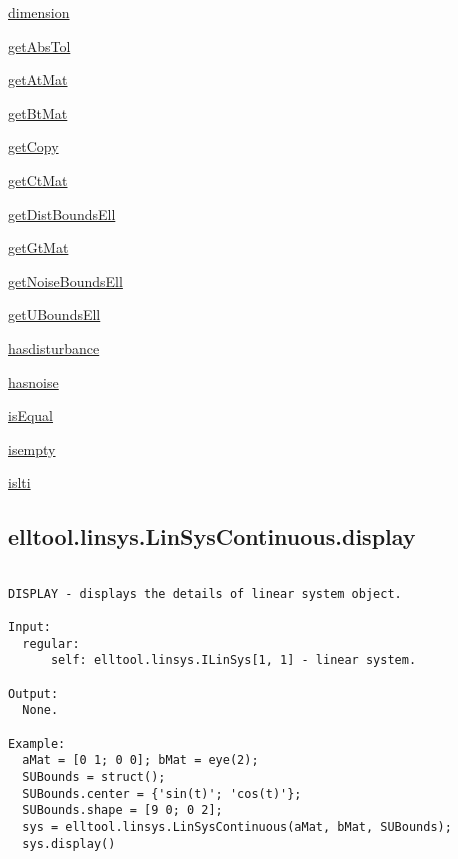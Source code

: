 \begin{list}{}{}
 \item \hyperref[method:elltool.linsys.ALinSys.dimension]{dimension}
 \item \hyperref[method:elltool.linsys.ALinSys.getAbsTol]{getAbsTol}
 \item \hyperref[method:elltool.linsys.ALinSys.getAtMat]{getAtMat}
 \item \hyperref[method:elltool.linsys.ALinSys.getBtMat]{getBtMat}
 \item \hyperref[method:elltool.linsys.ALinSys.getCopy]{getCopy}
 \item \hyperref[method:elltool.linsys.ALinSys.getCtMat]{getCtMat}
 \item \hyperref[method:elltool.linsys.ALinSys.getDistBoundsEll]{getDistBoundsEll}
 \item \hyperref[method:elltool.linsys.ALinSys.getGtMat]{getGtMat}
 \item \hyperref[method:elltool.linsys.ALinSys.getNoiseBoundsEll]{getNoiseBoundsEll}
 \item \hyperref[method:elltool.linsys.ALinSys.getUBoundsEll]{getUBoundsEll}
 \item \hyperref[method:elltool.linsys.ALinSys.hasdisturbance]{hasdisturbance}
 \item \hyperref[method:elltool.linsys.ALinSys.hasnoise]{hasnoise}
 \item \hyperref[method:elltool.linsys.ALinSys.isEqual]{isEqual}
 \item \hyperref[method:elltool.linsys.ALinSys.isempty]{isempty}
 \item \hyperref[method:elltool.linsys.ALinSys.islti]{islti}
\end{list}
\subsection{\texorpdfstring{elltool.linsys.LinSysContinuous.display}{display}}\label{method:elltool.linsys.LinSysContinuous.display}
\begin{verbatim}

DISPLAY - displays the details of linear system object.

Input:
  regular:
      self: elltool.linsys.ILinSys[1, 1] - linear system.

Output:
  None.

Example:
  aMat = [0 1; 0 0]; bMat = eye(2);
  SUBounds = struct();
  SUBounds.center = {'sin(t)'; 'cos(t)'};
  SUBounds.shape = [9 0; 0 2];
  sys = elltool.linsys.LinSysContinuous(aMat, bMat, SUBounds);
  sys.display()
\end{verbatim}
